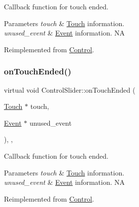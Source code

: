 Callback function for touch ended.


\begin{DoxyParams}{Parameters}
{\em touch} & \hyperlink{classTouch}{Touch} information. \\
\hline
{\em unused\+\_\+event} & \hyperlink{classEvent}{Event} information.  NA \\
\hline
\end{DoxyParams}


Reimplemented from \hyperlink{classControl_a56073e57060169fe80cbb6ce1f4abe28}{Control}.

\mbox{\label{classControlSlider_a9ba0559605c93e08dc4548261cbc2773}} 
\subsubsection{\texorpdfstring{on\+Touch\+Ended()}{onTouchEnded()}\hspace{0.1cm}{\footnotesize\ttfamily [2/2]}}
{\footnotesize\ttfamily virtual void Control\+Slider\+::on\+Touch\+Ended (\begin{DoxyParamCaption}\item[{\hyperlink{classTouch}{Touch} $\ast$}]{touch,  }\item[{\hyperlink{classEvent}{Event} $\ast$}]{unused\+\_\+event }\end{DoxyParamCaption})\hspace{0.3cm}{\ttfamily [override]}, {\ttfamily [protected]}, {\ttfamily [virtual]}}

Callback function for touch ended.


\begin{DoxyParams}{Parameters}
{\em touch} & \hyperlink{classTouch}{Touch} information. \\
\hline
{\em unused\+\_\+event} & \hyperlink{classEvent}{Event} information.  NA \\
\hline
\end{DoxyParams}


Reimplemented from \hyperlink{classControl_a56073e57060169fe80cbb6ce1f4abe28}{Control}.

\mbox{\label{classControlSlider_adc06e1f4b54e0f72c9359c111b6913ff}} 
